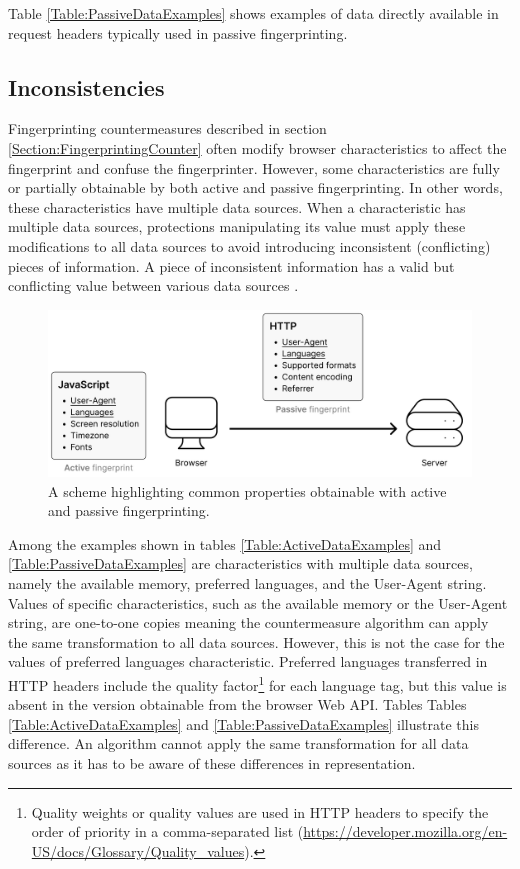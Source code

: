 Table \ref{Table:PassiveDataExamples} shows examples of data directly available in request headers typically used in passive fingerprinting.

\subsection{Inconsistencies}

Fingerprinting countermeasures described in section \ref{Section:FingerprintingCounter} often modify browser characteristics to affect the fingerprint and confuse the fingerprinter. However, some characteristics are fully or partially obtainable by both active and passive fingerprinting. In other words, these characteristics have multiple data sources. When a characteristic has multiple data sources, protections manipulating its value must apply these modifications to all data sources to avoid introducing inconsistent (conflicting) pieces of information. A piece of inconsistent information has a valid but conflicting value between various data sources \cite{VondracekDP}.

\begin{figure}[h]
    \centering
    \includegraphics[width=\textwidth]{obrazky-figures/inconsistencies_schema}
    \caption{A scheme highlighting common properties obtainable with active and passive fingerprinting.}
    \label{fig:mesh1}
\end{figure}

Among the examples shown in tables \ref{Table:ActiveDataExamples} and \ref{Table:PassiveDataExamples} are characteristics with multiple data sources, namely the available memory, preferred languages, and the User-Agent string. Values of specific characteristics, such as the available memory or the User-Agent string, are one-to-one copies meaning the countermeasure algorithm can apply the same transformation to all data sources. However, this is not the case for the values of preferred languages characteristic. Preferred languages transferred in HTTP headers include the quality factor\footnote{Quality weights or quality values are used in HTTP headers to specify the order of priority in a comma-separated list (\url{https://developer.mozilla.org/en-US/docs/Glossary/Quality_values}).} for each language tag, but this value is absent in the version obtainable from the browser Web API. Tables Tables \ref{Table:ActiveDataExamples} and \ref{Table:PassiveDataExamples} illustrate this difference. An algorithm cannot apply the same transformation for all data sources as it has to be aware of these differences in representation.

